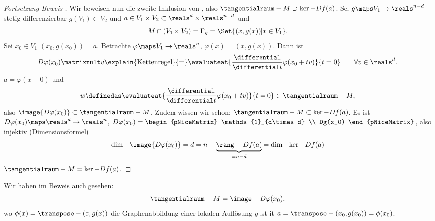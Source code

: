\begin{proof}[Fortsetzung Beweis ]
  Wir beweisen nun die zweite Inklusion von , also \( \tangentialraum-{M}\supset \ker-{Df(a)} \). Sei \( g\maps V_1\to \reals^{n-d} \) stetig differenzierbar \sd \( g(V_1)\subset V_2 \) und \( a\in V_1\times V_2\subset \reals^d \times \reals^{n-d} \) und
\begin{equation*}
  M\cap (V_1\times V_2)=\Gamma_g=\Set{(x,g(x))|x\in V_1}.
\end{equation*}
Sei \( x_0\in V_1  \) \sd \( (x_0,g(x_0))=a \). Betrachte \( \varphi\maps V_1\to \reals^n \), \( \varphi(x)=(x,g(x)) \). Dann ist
\begin{equation*}
  D\varphi(x_0)\matrixmult v\explain{\text{Kettenregel}}{=}\evaluateat{\frac{\differential}{\differential t} \varphi(x_0+tv)}{t=0}\qquad \forall v\in \reals^d.
\end{equation*}
\timplies \( a=\varphi(x-0) \) und 
\begin{equation*}
  w\definedas \evaluateat{\frac{\differential}{\differential t} \varphi(x_0+tv)}{t=0}\in \tangentialraum-{M},
\end{equation*}
also \( \image{D\varphi(x_0)}\subset \tangentialraum-{M} \). Zudem wissen wir schon: \( \tangentialraum-{M}\subset \ker-{Df(a)} \). Es ist \( D\varphi(x_0)\maps \reals^d\to \reals^n \), \( D\varphi(x_0)=\begin{pNiceMatrix} \mathds{1}_{d\times d} \\ Dg(x_0) \end{pNiceMatrix} \), also injektiv \timplies (Dimensionsformel)
\begin{equation*}
  \dim-{\image{D\varphi(x_0)}}=d=n-\underbrace{\rang-{Df(a)}}_{=n-d}=\dim-{\ker-{Df(a)}}
\end{equation*}
\timplies \( \tangentialraum-{M}=\ker-{Df(a)} \).
\end{proof}
Wir haben im Beweis auch gesehen:
\begin{equation*}
  \tangentialraum-{M}=\image-{D\varphi(x_0)},
\end{equation*}
wo \( \phi(x)=\transpose-{(x,g(x))} \) die Graphenabbildung einer lokalen Auflösung \( g \) ist it \( a=\transpose-{(x_0,g(x_0))}=\phi(x_0) \).

